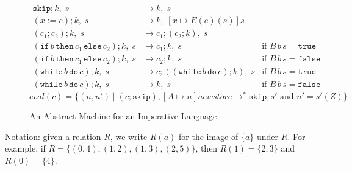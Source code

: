 \documentclass{tufte-handout}
\newcommand{\ASSIGN}[2]{#1 \mathrel{:=} #2}
\newcommand{\SEQ}[2]{#1 \mathrel{;} #2}
\newcommand{\SKIP}[0]{\mathtt{skip}}
\newcommand{\IF}[3]{\mathtt{if}\,#1\,\mathtt{then}\,#2\,\mathtt{else}\,#3}
\newcommand{\WHILE}[2]{\mathtt{while}\,#1\,\mathtt{do}\,#2}
\newcommand{\TRUE}[0]{\mathtt{true}}
\newcommand{\FALSE}[0]{\mathtt{false}}
\begin{document}
\begin{figure*}

\hfill {}
\begin{align*}
  \SEQ{\SKIP}{k},\; s & \longrightarrow k,\; s \\
  \SEQ{(\ASSIGN{x}{e})}{k},\; s & \longrightarrow k,\; [x\mapsto E(e)(s)]s\\
  \SEQ{(\SEQ{c_1}{c_2})}{k},\; s & \longrightarrow
      \SEQ{c_1}{(\SEQ{c_2}{k})},\; s \\
  \SEQ{(\IF{b}{c_1}{c_2})}{k},\; s & \longrightarrow \SEQ{c_1}{k},\; s
     & \text{if } B\,b\,s = \TRUE \\
  \SEQ{(\IF{b}{c_1}{c_2})}{k},\; s & \longrightarrow \SEQ{c_2}{k},\; s
     & \text{if } B\,b\,s = \FALSE \\
  \SEQ{(\WHILE{b}{c})}{k},\; s & \longrightarrow
      \SEQ{c}{(\SEQ{(\WHILE{b}{c})}{k})},\; s
    & \text{if } B\,b\,s = \TRUE \\
  \SEQ{(\WHILE{b}{c})}{k},\; s & \longrightarrow k,\; s
    & \text{if } B\,b\,s = \FALSE 
\end{align*}
\[
  \mathit{eval}(c) = \{ (n,n') \mid
     (\SEQ{c}{\SKIP}), [A\mapsto n]\mathit{newstore}
     \longrightarrow^{*} \SKIP, s'
     \text{ and } n' = s'(Z) \}
\]
\caption{An Abstract Machine for an Imperative Language}
\label{fig:imp-impl}
\end{figure*}

Notation: given a relation $R$, we write $R(a)$ for the image of
$\{a\}$ under $R$. For example, if $R=\{ (0,4), (1,2), (1,3), (2,5)
\}$, then $R(1) = \{2,3\}$ and $R(0) = \{4\}$.
\end{document}
